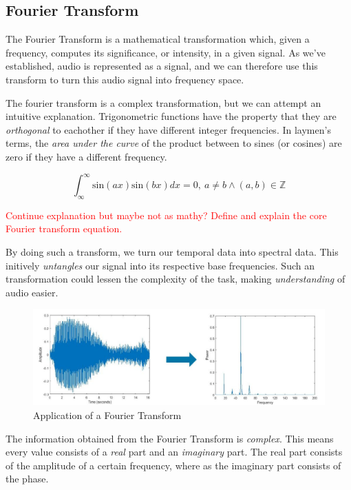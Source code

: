 \subsection{Fourier Transform}

The Fourier Transform is a mathematical transformation which, given a frequency, computes its significance, or intensity, in a given signal. As we've established, audio is represented as a signal, and we can therefore use this transform to turn this audio signal into frequency space. 

The fourier transform is a complex transformation, but we can attempt an intuitive explanation. Trigonometric functions have the property that they are \textit{orthogonal} to eachother if they have different integer frequencies. In laymen's terms, the \textit{area under the curve} of the product between to sines (or cosines) are zero if they have a different frequency.

$$ \int_{\infty}^{\infty} \text{sin}(ax) \text{sin}(bx) dx = 0, \ a \neq b \wedge (a, b) \in \mathbb{Z} $$

\textcolor{red}{Continue explanation but maybe not as mathy? Define and explain the core Fourier transform equation.}

By doing such a transform, we turn our temporal data into spectral data. This initively \textit{untangles} our signal into its respective base frequencies. Such an transformation could lessen the complexity of the task, making \textit{understanding} of audio easier.

\begin{figure}[H]
    \centering
    \includegraphics[scale=0.4]{figures/fft.jpg}
    \caption{Application of a Fourier Transform}
    \label{FTFigure}
\end{figure}

The information obtained from the Fourier Transform is \textit{complex}. This means every value consists of a \textit{real} part and an \textit{imaginary} part. The real part consists of the amplitude of a certain frequency, where as the imaginary part consists of the phase.

